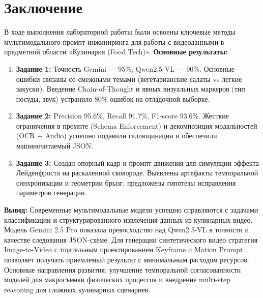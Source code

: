\documentclass[oneside,a4paper,14pt]{extarticle} %
\begin{document}
		\section*{Заключение}
		В ходе выполнения лабораторной работы были освоены ключевые методы мультимодального промпт-инжиниринга для работы с видеоданными в предметной области «Кулинария (Food Tech)».
		\noindent
		\textbf{Основные результаты:}
		\begin{enumerate}
			\item \textbf{Задание 1:} Точность Gemini — 95\%, Qwen2.5-VL — 90\%. Основные ошибки связаны со смежными темами (вегетарианские салаты vs легкие закуски). Введение Chain-of-Thought и явных визуальных маркеров (тип посуды, звук) устранило 80\% ошибок на отладочной выборке.
			\item \textbf{Задание 2:} Precision 95.6\%, Recall 91.7\%, F1-score 93.6\%. Жесткие ограничения в промпте (Schema Enforcement) и декомпозиция модальностей (OCR + Audio) успешно подавили галлюцинации и обеспечили машиночитаемый JSON.
			\item \textbf{Задание 3:} Создан опорный кадр и промпт движения для симуляции эффекта Лейденфроста на раскаленной сковороде. Выявлены артефакты темпоральной синхронизации и геометрии брызг, предложены гипотезы исправления параметров генерации.
		\end{enumerate}
		\noindent
		\textbf{Вывод:} Современные мультимодальные модели успешно справляются с задачами классификации и структурированного извлечения данных из кулинарных видео. Модель Gemini 2.5 Pro показала превосходство над Qwen2.5-VL в точности и качестве следования JSON-схеме. Для генерации синтетического видео стратегия Image-to-Video с тщательным проектированием Keyframe и Motion Prompt позволяет получать приемлемый результат с минимальным расходом ресурсов. Основные направления развития: улучшение темпоральной согласованности моделей для макросъемки физических процессов и внедрение multi-step reasoning для сложных кулинарных сценариев.
	
\end{document}

